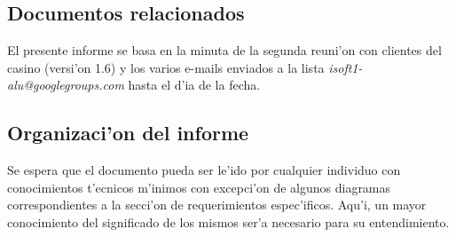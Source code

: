 \subsection{ Documentos relacionados}
El presente informe se basa en la minuta de la segunda reuni'on con clientes del casino (versi'on 1.6) y los varios e-mails enviados a la lista \textit{isoft1-alu@googlegroups.com} hasta el d'ia de la fecha.


\subsection{ Organizaci'on del informe	}
Se espera que el documento pueda ser le'ido por cualquier individuo con conocimientos t'ecnicos m'inimos con excepci'on de algunos diagramas correspondientes a la secci'on de requerimientos espec'ificos. Aqu'i, un mayor conocimiento del significado de los mismos ser'a necesario para su entendimiento.
